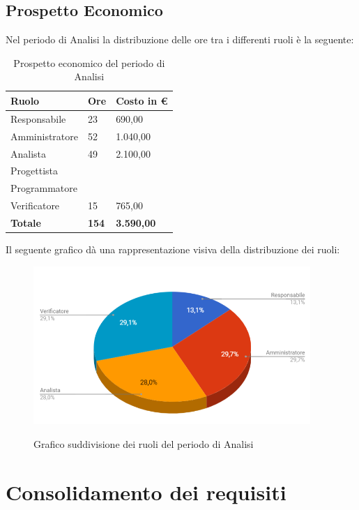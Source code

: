 \documentclass[PianoDiProgetto.tex]{subfiles}
\begin{document}
\subsection{Prospetto Economico}
Nel periodo di Analisi la distribuzione delle ore tra i differenti ruoli è la seguente:\\
\begin{table}[htbp]
	\centering
	\renewcommand\arraystretch{1.5}
	\begin{tabularx}{\textwidth}{p{5cm}|p{4cm}|p{4cm}}
		\hline
		\textbf{Ruolo} & \textbf{Ore} & \textbf{Costo in \euro} \\
		\hline
		Responsabile & 23 & 690,00 \\
		\hline
		Amministratore & 52 & 1.040,00 \\
		\hline
		Analista & 49 & 2.100,00 \\
		\hline
		Progettista & \ & \ \\
		\hline
		Programmatore & \ & \ \\
		\hline
		Verificatore & 15 & 765,00 \\
		\hline
		\textbf{Totale} & \textbf{154} & \textbf{3.590,00}\\
		\hline
	\end{tabularx}
	\caption{Prospetto economico del periodo di Analisi}
	\label{my-label}
\end{table} \newpage
Il seguente grafico dà una rappresentazione visiva della distribuzione dei ruoli:
\begin{figure}[h]
	\centering
	\includegraphics[width=10.5cm]{images/prospettoEconomico/analisi.png}
	\label{fig:foo}
	\caption{Grafico suddivisione dei ruoli del periodo di Analisi}
\end{figure} 
\section{Consolidamento dei requisiti}
\end{document}
